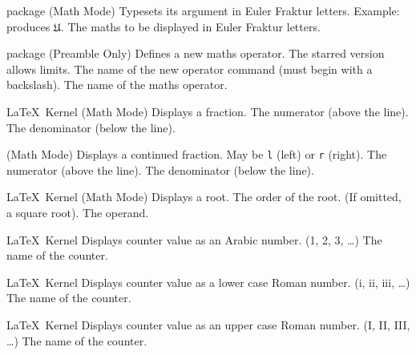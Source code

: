 %
 {}%
 { package (Math Mode)}%
 {Typesets its argument in Euler Fraktur letters.
  Example: \protect{} produces
  \ensuremath{\mathfrak{U}}.}%
 {%
   \BeginArgList
     The maths to be displayed in Euler Fraktur
      letters.
   \EndArgList
 }

%
 {}%
 { package (Preamble Only)}%
 {Defines a new maths operator. The starred version allows limits.}%
 {%
   \BeginArgList
     The name of the new operator command (must
      begin with a backslash).
     The name of the maths operator.
   \EndArgList
 }

%
 {}%
 {\LaTeX\ Kernel (Math Mode)}%
 {Displays a fraction.}%
 {%
    \BeginArgList
      The numerator (above the line).
      The denominator (below the line).
    \EndArgList
 }

%
 {}%
 { (Math Mode)}%
 {Displays a continued fraction.}%
 {%
    \BeginArgList
      May be \texttt{l} (left) or \texttt{r}
      (right).
      The numerator (above the line).
      The denominator (below the line).
    \EndArgList
 }

%
 {}%
 {\LaTeX\ Kernel (Math Mode)}%
 {Displays a root.}%
 {%
    \BeginArgList
      The order of the root. (If omitted, a
       square root).
      The operand.
    \EndArgList
 }

%
 {}%
 {\LaTeX\ Kernel}%
 {Displays counter value as an Arabic number. (1, 2, 3, \ldots)}%
 {%
    \BeginArgList
      The name of the counter.
    \EndArgList
 }

%
 {}%
 {\LaTeX\ Kernel}%
 {Displays counter value as a lower case Roman number. (i, ii, iii, \ldots)}%
 {%
    \BeginArgList
      The name of the counter.
    \EndArgList
 }

%
 {}%
 {\LaTeX\ Kernel}%
 {Displays counter value as an upper case Roman number. (I, II, III, \ldots)}%
 {%
    \BeginArgList
      The name of the counter.
    \EndArgList
 }

